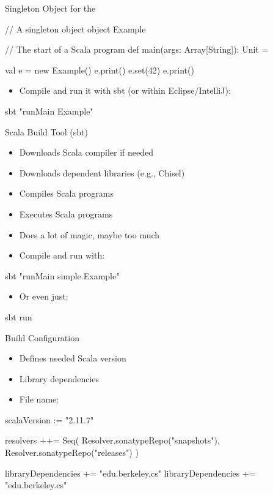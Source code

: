 \begin{frame}[fragile]{Singleton Object for the }
\begin{chisel}
// A singleton object
object Example {
  
  // The start of a Scala program
  def main(args: Array[String]): Unit = {
    
    val e = new Example()
    e.print()
    e.set(42)
    e.print()
  }
}
\end{chisel}
\begin{itemize}
\item Compile and run it with sbt (or within Eclipse/IntelliJ):
\end{itemize}
\begin{chisel}
sbt "runMain Example"
\end{chisel}
\end{frame}

\begin{frame}[fragile]{Scala Build Tool (sbt)}
\begin{itemize}
\item Downloads Scala compiler if needed
\item Downloads dependent libraries (e.g., Chisel)
\item Compiles Scala programs
\item Executes Scala programs
\item Does a lot of magic, maybe too much
\item Compile and run with:
\end{itemize}
\begin{chisel}
sbt "runMain simple.Example"
\end{chisel}
\begin{itemize}
\item Or even just:
\end{itemize}
\begin{chisel}
sbt run
\end{chisel}
\end{frame}

\begin{frame}[fragile]{Build Configuration}
\begin{itemize}
\item Defines needed Scala version
\item Library dependencies
\item File name: 
\end{itemize}
\begin{chisel}
scalaVersion := "2.11.7"

resolvers ++= Seq(
  Resolver.sonatypeRepo("snapshots"),
  Resolver.sonatypeRepo("releases")
)

libraryDependencies += "edu.berkeley.cs" %
libraryDependencies += "edu.berkeley.cs" %
\end{chisel}
\end{frame}


